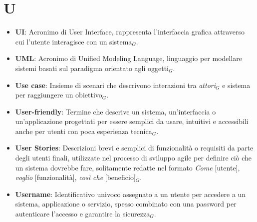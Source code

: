 \section{U}
\begin{itemize}
    \item \textbf{UI}: Acronimo di User Interface, rappresenta l'interfaccia grafica attraverso cui l'utente interagisce con un sistema$_G$.
    \item \textbf{UML}: Acronimo di Unified Modeling Language, linguaggio per modellare sistemi basati sul paradigma orientato agli oggetti$_G$.
    \item \textbf{Use case}: Insieme di scenari che descrivono interazioni tra \textit{attori}$_G$ e sistema per raggiungere un obiettivo$_G$.
    \item \textbf{User-friendly}: Termine che descrive un sistema, un'interfaccia o un'applicazione progettati per essere semplici da usare, intuitivi e accessibili anche per utenti con poca esperienza tecnica$_G$.
    \item \textbf{User Stories}: Descrizioni brevi e semplici di funzionalità o requisiti da parte degli utenti finali, utilizzate nel processo di sviluppo agile per definire ciò che un sistema dovrebbe fare, solitamente redatte nel formato \textit{Come} [utente], \textit{voglio} [funzionalità], \textit{così che} [beneficio]$_G$.
    \item \textbf{Username}: Identificativo univoco assegnato a un utente per accedere a un sistema, applicazione o servizio, spesso combinato con una password per autenticare l'accesso e garantire la sicurezza$_G$.
\end{itemize}
